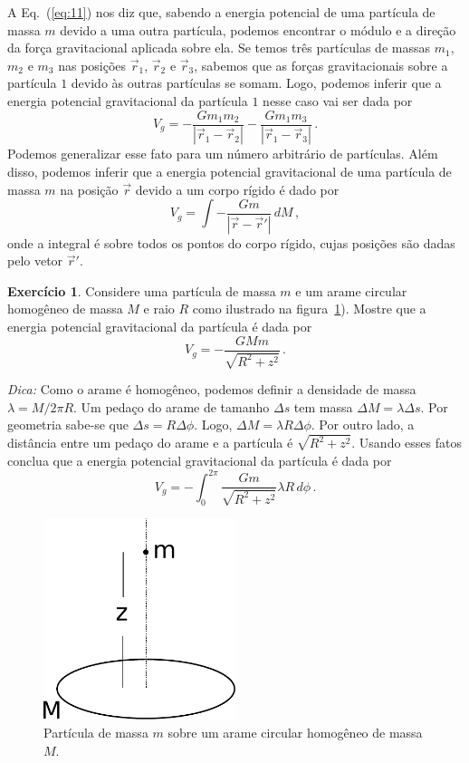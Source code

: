 \documentclass[12pt,a4paper]{article}
\theoremstyle{definition}
\newtheorem{ex}{Exercício}[section]
\begin{document}
A Eq.~(\ref{eq:11}) nos diz que, sabendo a energia potencial de uma
partícula de massa $m$ devido a uma outra partícula, podemos encontrar
o módulo e a direção da força gravitacional aplicada sobre ela. Se
temos três partículas de massas $m_1$, $m_2$ e $m_3$ nas posições
$\vec r_1$, $\vec r_2$ e $\vec r_3$, sabemos que as forças
gravitacionais sobre a partícula $1$ devido às outras partículas se
somam. Logo, podemos inferir que a energia potencial gravitacional da
partícula $1$ nesse caso vai ser dada por
$$V_g=-\frac{Gm_1m_2}{|\vec r_1-\vec r_2|}-\frac{Gm_1m_3}{|\vec r_1-\vec r_3|}\,.$$
Podemos generalizar esse fato para um número arbitrário de
partículas. Além disso, podemos inferir que a energia potencial
gravitacional de uma partícula de massa $m$ na posição $\vec r$ devido
a um corpo rígido é dado por
$$V_g=\int -\frac{Gm}{|\vec r-\vec r'|}\,dM\,,$$
onde a integral é sobre todos os pontos do corpo rígido, cujas
posições são dadas pelo vetor $\vec r'$.

\begin{ex}
  Considere uma partícula de massa $m$ e um arame circular homogêneo
  de massa $M$ e raio $R$ como ilustrado na
  figura~\ref{fig:potencial_espira}). Mostre que a energia potencial
  gravitacional da partícula é dada por
  $$V_g=-\frac{GMm}{\sqrt{R^2+z^2}}\,.$$

  \noindent\textit{Dica:} Como o arame é homogêneo, podemos definir a
  densidade de massa $\lambda=M/2\pi R$. Um pedaço do arame de tamanho
  $\Delta s$ tem massa $\Delta M=\lambda\Delta s$. Por geometria
  sabe-se que $\Delta s=R\Delta\phi$. Logo,
  $\Delta M=\lambda R\Delta\phi$. Por outro lado, a distância entre um
  pedaço do arame e a partícula é $\sqrt{R^2+z^2}$. Usando esses fatos
  conclua que a energia potencial gravitacional da partícula é dada
  por
  $$V_g=-\int_0^{2\pi}\frac{Gm}{\sqrt{R^2+z^2}}\lambda R\,d\phi\,.$$
  \begin{figure}[t]
    \centering
    \includegraphics[width=0.5\textwidth,keepaspectratio]{aux/potencial_espira.pdf}
    \caption{Partícula de massa $m$ sobre um arame circular homogêneo
      de massa $M$.}
    \label{fig:potencial_espira}
  \end{figure}
\end{ex}
\end{document}
